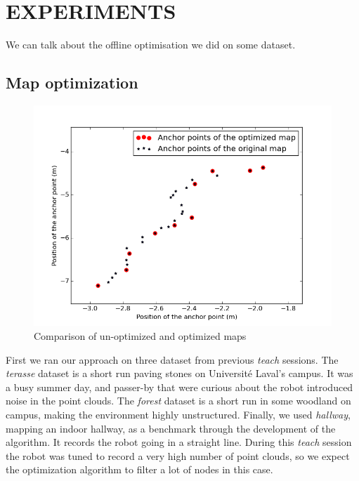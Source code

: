\documentclass[letterpaper,10 pt,conference]{ieeeconf}
\begin{document}
\section{EXPERIMENTS}
We can talk about the offline optimisation we did on some dataset.

\subsection{Map optimization}

\begin{figure}
  \centering
  \includegraphics[scale=0.4]{map_optimization}
  \caption{Comparison of un-optimized and optimized maps}
\end{figure}

First we ran our approach on three dataset from previous \textit{teach} sessions. The
\textit{terasse} dataset is a short run paving stones on Université Laval's campus. It was a busy
summer day, and passer-by that were curious about the robot introduced noise in the point
clouds. The \textit{forest} dataset is a short run in some woodland on campus, making the environment
highly unstructured. Finally, we used \textit{hallway}, mapping an indoor hallway, as a
benchmark through the development of the algorithm. It records the robot going in a straight line.
During this \textit{teach} session the robot was tuned to record a very high number of point clouds,
so we expect the optimization algorithm to filter a lot of nodes in this case.
\end{document}
